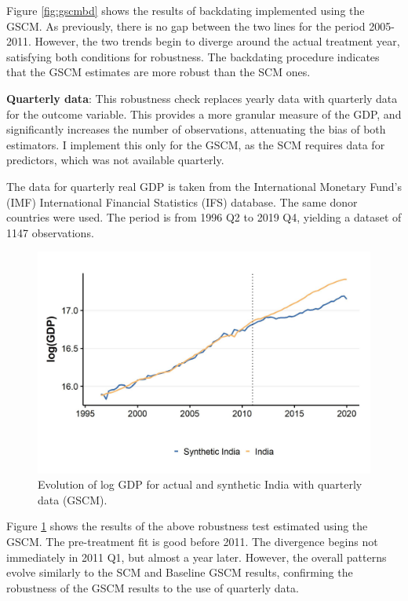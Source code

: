\documentclass[12pt,nobind, a4paper]{reedthesis}
\begin{document}
 Figure \ref{fig:gscmbd} shows the results of backdating implemented using the GSCM. As previously, there is no gap between the two lines for the period 2005-2011. However, the two trends begin to diverge around the actual treatment year, satisfying both conditions for robustness. The backdating procedure indicates that the GSCM estimates are more robust than the SCM ones.
 \linebreak

 \textbf{Quarterly data}: This robustness check replaces yearly data with quarterly data for the outcome variable. This provides a more granular measure of the GDP, and significantly increases the number of observations, attenuating the bias of both estimators. I implement this only for the GSCM, as the SCM requires data for predictors, which was not available quarterly.
 \linebreak

 The data for quarterly real GDP is taken from the International Monetary Fund's (IMF) International Financial Statistics (IFS) database. The same donor countries were used. The period is from 1996 Q2 to 2019 Q4, yielding a dataset of 1147 observations.
 \begin{figure}

 {\centering \includegraphics[width=1\linewidth]{figure/indiagsynthqtr} 

 }

 \caption{Evolution of log GDP for actual and synthetic India with quarterly data (GSCM).}\label{fig:gqtr}
 \end{figure}
 Figure \ref{fig:gqtr} shows the results of the above robustness test estimated using the GSCM. The pre-treatment fit is good before 2011. The divergence begins not immediately in 2011 Q1, but almost a year later. However, the overall patterns evolve similarly to the SCM and Baseline GSCM results, confirming the robustness of the GSCM results to the use of quarterly data.
 \linebreak
\end{document}
